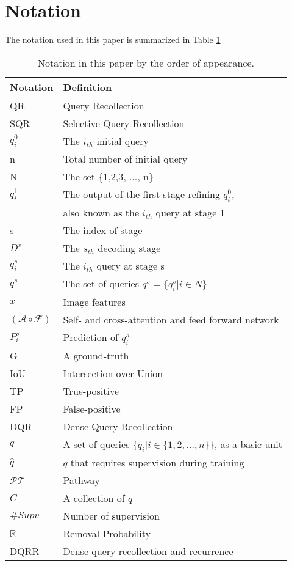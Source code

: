 \documentclass[10pt,twocolumn,letterpaper]{article}
\begin{document}
\section{Notation}

The notation used in this paper is summarized in Table \ref{tab:notation}
\begin{table}[t]
    \centering
    \caption{Notation in this paper by the order of appearance.}
    \begin{tabular}{@{}ll@{}}
    \toprule[1pt]
    Notation & Definition \\ 
    \midrule
    QR      &   Query Recollection   \\
    SQR    &  Selective Query Recollection   \\
    $q_i^0$    &   The $i_{th}$ initial query      \\
    n    &   Total number of initial query  \\
    N    & The set \{1,2,3, ..., n\}\\
    $q_i^1$ & The output of the first stage refining $q_i^0$,\\
           & also known as the $i_{th}$ query at stage 1 \\
    s & The index of stage\\
    $D^s$ & The $s_{th}$ decoding stage\\
    $q_i^s$ & The $i_{th}$ query at stage s \\
    $q^s$ & The set of queries $q^s=\{q_i^s|i\in N\}$\\
    $x$ & Image features\\
    $(\mathcal{A}\circ\mathcal{F})$ & Self- and cross-attention and feed forward network\\
    $P_i^s$ & Prediction of $q_i^s$\\
    G & A ground-truth \\
    IoU & Intersection over Union\\
    TP & True-positive\\
    FP & False-positive\\
    DQR & Dense Query Recollection\\
    $q$ & A set of queries $\{q_{i}|i\in \{1,2,...,n\}\}$, as a basic unit\\
    $\hat{q}$ & $q$ that requires supervision during training\\
    $\mathcal{PT}$ & Pathway\\
    $C$ & A collection of $q$\\
    $\#Supv$ & Number of supervision\\
    $\mathbb{R}$ & Removal Probability\\
    DQRR & Dense query recollection and recurrence  \\
    \bottomrule[1pt]
    \end{tabular}
    \label{tab:notation}
\end{table}
\end{document}
